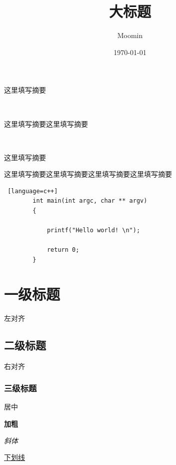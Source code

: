 \documentclass{article}
\title{大标题}
\author{Moomin}
\date{\today}
\begin{document}
	\maketitle %

	\tableofcontents

	这里填写摘要

	~ %

	这里填写摘要这里填写摘要

	~

	这里填写摘要

	\vspace{7cm} %

	这里填写摘要这里填写摘要这里填写摘要这里填写摘要

	\begin{lstlisting} [language=c++]
		int main(int argc, char ** argv) 
		{ 

			printf("Hello world! \n"); 

			return 0; 
		} 
		\end{lstlisting}

	\newpage

	\section{一级标题}

	\begin{flushleft}
	左对齐
	\end{flushleft}

	\newpage

	\subsection{二级标题}

	\begin{flushright}
	右对齐
	\end{flushright}

	\subsubsection{三级标题}

	\begin{center}
	居中
	\end{center}

	\textbf{加粗}

	\textit{斜体}

	\underline{下划线}
\end{document}

